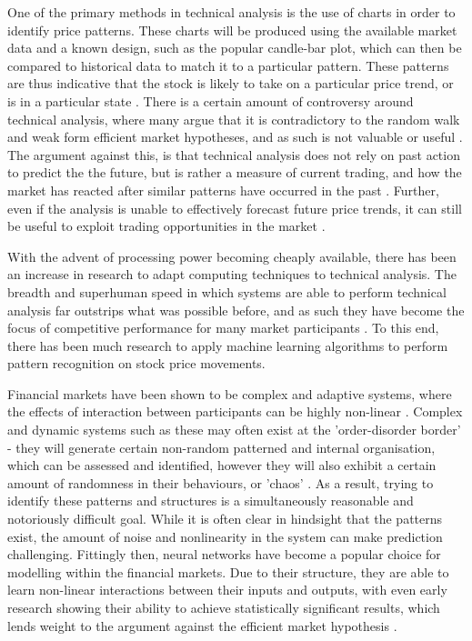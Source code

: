 \documentclass[a4paper,11pt,oneside]{article}
\theoremstyle{plain}
\theoremstyle{definition}
\begin{document}
One of the primary methods in technical analysis is the use of charts in order to identify price patterns. 
These charts will be produced using the available market data and a known design, such as the popular candle-bar 
plot, which can then be compared to historical data to match it to a particular pattern. These patterns are thus 
indicative that the stock is likely to take on a particular price trend, or is in a particular state \cite {Murphy}.  
There is a certain amount of controversy around technical analysis, where many argue that it is contradictory 
to the random walk and weak form efficient market hypotheses, and as such is not valuable or useful \cite {Griffioen}. 
The argument against this, is that technical analysis does not rely on past action to predict the the future, but is 
rather a measure of current trading, and how the market has reacted after similar patterns have occurred in the 
past \cite {Kahn}. Further, even if the analysis is unable to effectively forecast future price trends, it can still be useful 
to exploit trading opportunities in the market \cite{Schwager}.
\hfill \break 

With the advent of processing power becoming cheaply available, there has been an increase in research to 
adapt computing techniques to technical analysis. The breadth and superhuman speed in which systems are 
able to perform technical analysis far outstrips what was possible before, and as such they have become the 
focus of competitive performance for many market participants \cite {Johnson}. To this end, there has been much 
research to apply machine learning algorithms to perform pattern recognition on stock price movements.
\hfill \break

Financial markets have been shown to be complex and adaptive systems, where the effects of interaction 
between participants can be highly non-linear \cite {Arthur}. Complex and dynamic systems such as these may 
often exist at the 'order-disorder border' - they will generate certain non-random patterned and internal organisation, 
which can be assessed and identified, however they will also exhibit a certain amount of randomness in their behaviours, 
or 'chaos' \cite {Crutchfield}. As a result, trying to identify these patterns and structures is a simultaneously 
reasonable and notoriously difficult goal. While it is often clear in hindsight that the patterns exist, the amount of 
noise and nonlinearity in the system can make prediction challenging.
Fittingly then, neural networks have become a popular choice for modelling within the financial markets. Due to 
their structure, they are able to learn non-linear interactions between their inputs and outputs, with even early research 
showing their ability to achieve statistically significant results, which lends weight to the 
argument against the efficient market hypothesis \cite {Skabar}. 
\hfill \break
\end{document}
